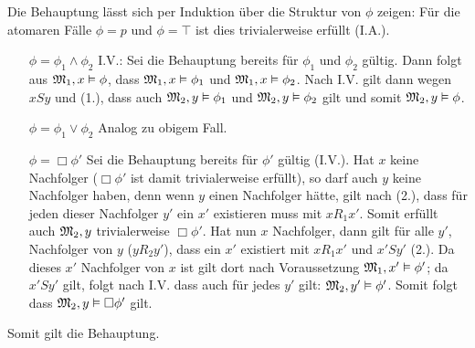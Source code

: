 

Die Behauptung lässt sich per Induktion über die Struktur von $\phi$ zeigen:
Für die atomaren Fälle $\phi = p$ und $\phi = \top$ ist dies trivialerweise erfüllt (I.A.).
\begin{itemize}
	\item[$\phi = \phi_1 \wedge \phi_2$] I.V.: Sei die Behauptung bereits für $\phi_1$ und $\phi_2$ gültig.
		Dann folgt aus $\mathfrak{M}_1, x \vDash \phi$, dass $\mathfrak{M}_1, x \vDash \phi_1$ und $\mathfrak{M}_1, x \vDash \phi_2$. Nach I.V. gilt dann
		wegen $xSy$ und (1.), dass auch $\mathfrak{M}_2, y \vDash \phi_1$ und $\mathfrak{M}_2, y \vDash \phi_2$ gilt und somit
		$\mathfrak{M}_2, y \vDash \phi$. 
	\item[$\phi = \phi_1 \vee \phi_2 $] Analog zu obigem Fall.
	\item[$\phi = \Box \phi'$] Sei die Behauptung bereits für $\phi'$ gültig (I.V.).
		Hat $x$ keine Nachfolger ($\Box \phi'$ ist damit trivialerweise erfüllt), so darf auch $y$ keine Nachfolger haben,
		denn wenn $y$ einen Nachfolger hätte, gilt nach (2.), dass für jeden dieser Nachfolger $y'$ ein $x'$ existieren muss mit $xR_1x'$. Somit erfüllt auch
		$\mathfrak{M}_2, y$ trivialerweise $\Box \phi'$.
		Hat nun $x$ Nachfolger, dann gilt für alle $y'$, Nachfolger von $y$ ($yR_2y'$), dass ein $x'$ existiert mit $xR_1x'$ und $x'Sy'$ (2.). Da dieses $x'$ Nachfolger von
		$x$ ist gilt dort nach Voraussetzung $\mathfrak{M}_1, x' \vDash \phi'$; da $x'Sy'$ gilt, folgt nach I.V. dass auch für jedes $y'$ gilt: $\mathfrak{M}_2, y' \vDash \phi'$.
		Somit folgt dass $\mathfrak{M}_2, y \vDash \Box \phi'$ gilt.
\end{itemize}
Somit gilt die Behauptung.




